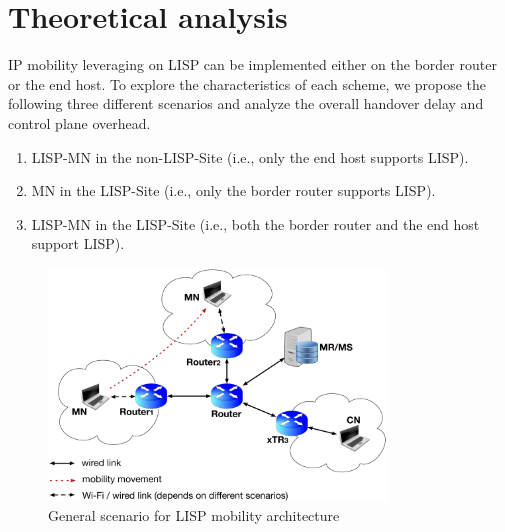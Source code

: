 
\section{Theoretical analysis}
\label{sec:ns3_analysis}
IP mobility leveraging on LISP can be implemented either on the border router or the end host. To explore the characteristics of each scheme, we propose the following three different scenarios and analyze the overall handover delay and control plane overhead. 
\begin{enumerate}[noitemsep,topsep=0pt]
	\item LISP-MN in the non-LISP-Site (i.e., only the end host supports LISP). 
	\item MN in the LISP-Site (i.e., only the border router supports LISP). 
	\item LISP-MN in the LISP-Site (i.e., both the border router and the end host support LISP). 
\end{enumerate}	
\begin{figure}[!th]
	\centering
	\includegraphics[width=0.8\textwidth]{Pics/LISP_mobility_archi}
	\caption{General scenario for LISP mobility architecture}
	\label{sim_archi}
\end{figure}

